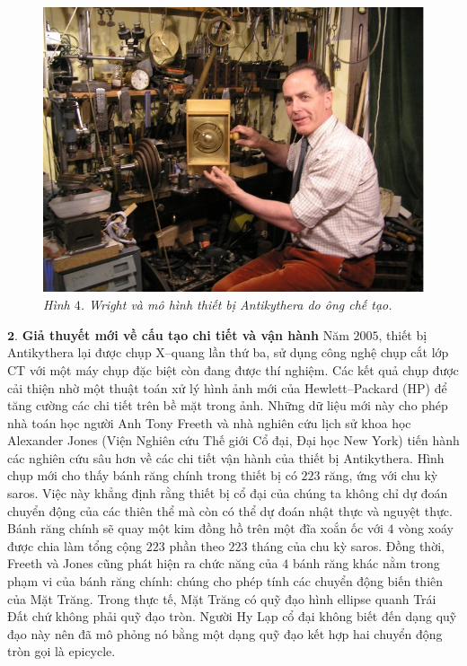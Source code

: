 \begin{multicols}{2}
\begin{figure}[H]
		\includegraphics[width= 1\linewidth]{5}
		\caption{\small\textit{\color{lichsutoanhoc}Hình $4$. Wright và mô hình thiết bị Antikythera do ông chế tạo.}}
		\vspace*{-10pt}
	\end{figure}
	$\pmb{2.}$ \textbf{\color{lichsutoanhoc}Giả thuyết mới về cấu tạo chi tiết và vận hành}
	\vskip 0.05cm
	Năm $2005$, thiết bị Antikythera lại được chụp X--quang lần thứ ba, sử dụng công nghệ chụp cắt lớp CT với một máy chụp đặc biệt còn đang được thí nghiệm. Các kết quả chụp được cải thiện nhờ một thuật toán xử lý hình ảnh mới của Hewlett--Packard (HP) để tăng cường các chi tiết trên bề mặt trong ảnh. Những dữ liệu mới này cho phép nhà toán học người Anh Tony Freeth và nhà nghiên cứu lịch sử khoa học Alexander Jones (Viện  Nghiên cứu Thế giới Cổ đại, Đại học New York) tiến hành các nghiên cứu sâu hơn về các chi tiết vận hành của thiết bị Antikythera.
	\vskip 0.1cm
	Hình chụp mới cho thấy bánh răng chính trong thiết bị có $223$ răng, ứng với chu kỳ saros. Việc này khẳng định rằng thiết bị cổ đại của chúng ta không chỉ dự đoán chuyển động của các thiên thể mà còn có thể dự đoán nhật thực và nguyệt thực. Bánh răng chính sẽ quay một kim đồng hồ trên một đĩa xoắn ốc với $4$ vòng xoáy được chia làm tổng cộng $223$ phần theo $223$ tháng của chu kỳ {saros}. Đồng thời, Freeth và Jones cũng phát hiện ra chức năng của $4$ bánh răng khác nằm trong phạm vi của bánh răng chính: chúng cho phép tính các chuyển động biến thiên của Mặt Trăng. Trong thực tế, Mặt Trăng có quỹ đạo hình ellipse quanh Trái Đất chứ không phải quỹ đạo tròn. Người Hy Lạp cổ đại không biết đến dạng quỹ đạo này nên đã mô phỏng nó bằng một dạng quỹ đạo kết hợp hai chuyển động tròn gọi là epicycle.

\end{multicols}
